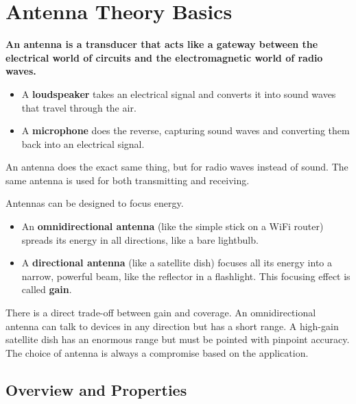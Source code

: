 
\chapter{Antenna Theory Basics}
\label{ch:antenna}

\begin{nontechnical}
    \textbf{An antenna is a transducer that acts like a gateway between the electrical world of circuits and the electromagnetic world of radio waves.}

    \begin{itemize}
        \item A \textbf{loudspeaker} takes an electrical signal and converts it into sound waves that travel through the air.
        \item A \textbf{microphone} does the reverse, capturing sound waves and converting them back into an electrical signal.
    \end{itemize}
    An antenna does the exact same thing, but for radio waves instead of sound. The same antenna is used for both transmitting and receiving.

    Antennas can be designed to focus energy.
    \begin{itemize}
        \item An \textbf{omnidirectional antenna} (like the simple stick on a WiFi router) spreads its energy in all directions, like a bare lightbulb.
        \item A \textbf{directional antenna} (like a satellite dish) focuses all its energy into a narrow, powerful beam, like the reflector in a flashlight. This focusing effect is called \textbf{gain}.
    \end{itemize}

    There is a direct trade-off between gain and coverage. An omnidirectional antenna can talk to devices in any direction but has a short range. A high-gain satellite dish has an enormous range but must be pointed with pinpoint accuracy. The choice of antenna is always a compromise based on the application.
\end{nontechnical}


\section{Overview and Properties}

